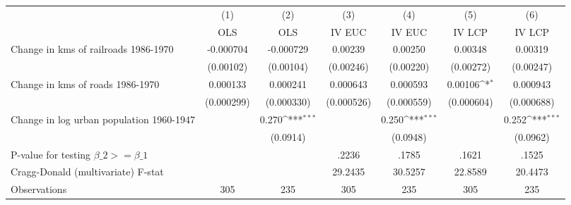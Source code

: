 {
\def\sym#1{\ifmmode^{#1}\else\(^{#1}\)\fi}
\begin{tabular}{l*{6}{c}}
\hline\hline
                &\multicolumn{1}{c}{(1)}&\multicolumn{1}{c}{(2)}&\multicolumn{1}{c}{(3)}&\multicolumn{1}{c}{(4)}&\multicolumn{1}{c}{(5)}&\multicolumn{1}{c}{(6)}\\
                &\multicolumn{1}{c}{OLS}&\multicolumn{1}{c}{OLS}&\multicolumn{1}{c}{IV EUC}&\multicolumn{1}{c}{IV EUC}&\multicolumn{1}{c}{IV LCP}&\multicolumn{1}{c}{IV LCP}\\
\hline
Change in kms of railroads 1986-1970&-0.000704         &-0.000729         &  0.00239         &  0.00250         &  0.00348         &  0.00319         \\
                &(0.00102)         &(0.00104)         &(0.00246)         &(0.00220)         &(0.00272)         &(0.00247)         \\
[1em]
Change in kms of roads 1986-1970& 0.000133         & 0.000241         & 0.000643         & 0.000593         &  0.00106\sym{*}  & 0.000943         \\
                &(0.000299)         &(0.000330)         &(0.000526)         &(0.000559)         &(0.000604)         &(0.000688)         \\
[1em]
Change in log urban population 1960-1947&                  &    0.270\sym{***}&                  &    0.250\sym{***}&                  &    0.252\sym{***}\\
                &                  & (0.0914)         &                  & (0.0948)         &                  & (0.0962)         \\
\hline
P-value for testing $\beta\_{2} >= \beta\_{1}$&                  &                  &    .2236         &    .1785         &    .1621         &    .1525         \\
Cragg-Donald (multivariate) F-stat&                  &                  &  29.2435         &  30.5257         &  22.8589         &  20.4473         \\
Observations    &      305         &      235         &      305         &      235         &      305         &      235         \\
\hline\hline
\end{tabular}
}
